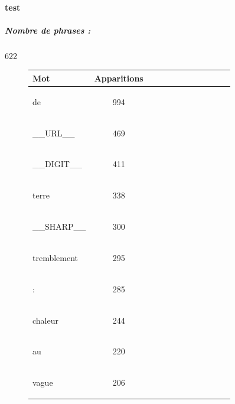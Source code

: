  \paragraph{test } 
\subparagraph{Nombre de phrases :} 622\\ 
\begin{figure}[H] \begin{minipage}{0.48\textwidth} \centering \begin{tabular}{|l || *{11 }{|c} |} \hline
Mot & Apparitions  \\ \hline
\begin{verb} de \end{verb} &994\\ \hline
\begin{verb} __URL__ \end{verb} &469\\ \hline
\begin{verb} __DIGIT__ \end{verb} &411\\ \hline
\begin{verb} terre \end{verb} &338\\ \hline
\begin{verb} __SHARP__ \end{verb} &300\\ \hline
\begin{verb} tremblement \end{verb} &295\\ \hline
\begin{verb} : \end{verb} &285\\ \hline
\begin{verb} chaleur \end{verb} &244\\ \hline
\begin{verb} au \end{verb} &220\\ \hline
\begin{verb} vague \end{verb} &206\\ \hline


\end{tabular}
\end{minipage}
\end{figure}
